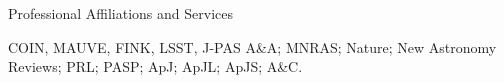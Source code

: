 \makeatletter
\def\@@subrubric#1{%
\rule{0bp}{\@beforespace}%
{\@subrubricfont#1}
\@subrubricmark{#1}}
\makeatother


\begin{rubric}{Professional Affiliations and Services}

\entry*[Projects] COIN, MAUVE, FINK, LSST, J-PAS
%
\entry*[Referee]
A\&A; MNRAS; Nature; New Astronomy Reviews; PRL; PASP; ApJ; ApJL; ApJS; A\&C. 
%
\end{rubric}